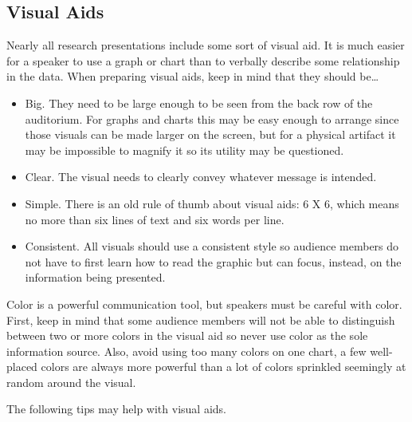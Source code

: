 \subsection{Visual Aids}

Nearly all research presentations include some sort of visual aid. It is much easier for a speaker to use a graph or chart than to verbally describe some relationship in the data. When preparing visual aids, keep in mind that they should be\ldots

\begin{itemize}
	\item Big. They need to be large enough to be seen from the back row of the auditorium. For graphs and charts this may be easy enough to arrange since those visuals can be made larger on the screen, but for a physical artifact it may be impossible to magnify it so its utility may be questioned.
	
	\item Clear. The visual needs to clearly convey whatever message is intended.
	
	\item Simple. There is an old rule of thumb about visual aids: 6 X 6, which means no more than six lines of text and six words per line.
	
	\item Consistent. All visuals should use a consistent style so audience members do not have to first learn how to read the graphic but can focus, instead, on the information being presented.
	
\end{itemize}

Color is a powerful communication tool, but speakers must be careful with color. First, keep in mind that some audience members will not be able to distinguish between two or more colors in the visual aid so never use color as the sole information source. Also, avoid using too many colors on one chart, a few well-placed colors are always more powerful than a lot of colors sprinkled seemingly at random around the visual. 

The following tips may help with visual aids.

